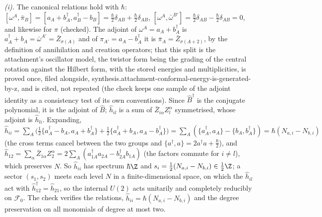 \emph{(i).} The canonical relations hold with $\hbar$: $[\omega^{A}, \bar{\pi}_{B}] = [a_{A} + b^{\dagger}_{A}, a^{\dagger}_{B} - b_{B}] = \tfrac{\hbar}{2}\delta_{AB} + \tfrac{\hbar}{2}\delta_{AB}$, $[\omega^{A}, \bar{\omega}^{B'}] = \tfrac{\hbar}{2}\delta_{AB} - \tfrac{\hbar}{2}\delta_{AB} = 0$, and likewise for $\pi$ (checked). The adjoint of $\omega^{A} = a_{A} + b^{\dagger}_{A}$ is $a^{\dagger}_{A} + b_{A} = \bar{\omega}^{A'} = \bar{Z}_{\sigma(A)}$ and of $\pi_{A'} = a_{A} - b^{\dagger}_{A}$ it is $\bar{\pi}_{A} = \bar{Z}_{\sigma(A+2)}$, by the definition of annihilation and creation operators; that this split is the attachment's oscillator model, the twistor form being the grading of the central rotation against the Hilbert form, with the stored energies and multiplicities, is proved once, filed alongside, synthesis.attachment-conformal-energy-is-generated-by-z, and is cited, not repeated (the check keeps one sample of the adjoint identity as a consistency test of its own conventions). Since $\hat{B}^{\dagger}$ is the conjugate polynomial, it is the adjoint of $\hat{B}$; $\hat{h}_{il}$ is a sum of $\bar{Z}_{i\alpha}Z^{\alpha}_{l}$ symmetrised, whose adjoint is $\hat{h}_{li}$. Expanding, $\hat{h}_{ii} = \sum_{A}\bigl(\tfrac12\{a^{\dagger}_{A} - b_{A}, a_{A} + b^{\dagger}_{A}\} + \tfrac12\{a^{\dagger}_{A} + b_{A}, a_{A} - b^{\dagger}_{A}\}\bigr) = \sum_{A}(\{a^{\dagger}_{A}, a_{A}\} - \{b_{A}, b^{\dagger}_{A}\}) = \hbar(N_{a,i} - N_{b,i})$ (the cross terms cancel between the two groups and $\{a^{\dagger}, a\} = 2a^{\dagger}a + \tfrac{\hbar}{2}$), and $\hat{h}_{12} = \sum_{\alpha}\bar{Z}_{1\alpha}Z^{\alpha}_{2} = 2\sum_{A}(a^{\dagger}_{1A}a_{2A} - b^{\dagger}_{2A}b_{1A})$ (the factors commute for $i \ne l$), which preserves $N$. So $\hat{h}_{ii}$ has spectrum $\hbar\Z$ and $s_{i} = \tfrac12(N_{a,i} - N_{b,i}) \in \tfrac12\Z$; a sector $(s_{1}, s_{2})$ meets each level $N$ in a finite-dimensional space, on which the $\hat{h}_{il}$ act with $\hat{h}_{12}^{\dagger} = \hat{h}_{21}$, so the internal $U(2)$ acts unitarily and completely reducibly on $\mathcal{F}_{0}$. The check verifies the relations, $\hat{h}_{ii} = \hbar(N_{a,i} - N_{b,i})$ and the degree preservation on all monomials of degree at most two.

